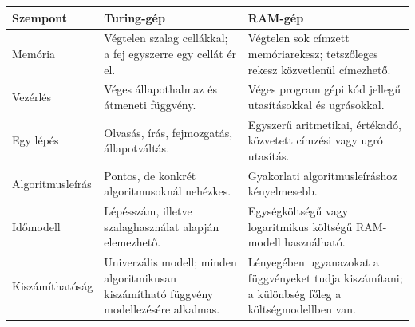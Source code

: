 \begin{tabularx}{\textwidth}{L{40mm}L{42mm}X}
\toprule
\textbf{Szempont} & \textbf{Turing-gép} & \textbf{RAM-gép} \\
\midrule
Memória & Végtelen szalag cellákkal; a fej egyszerre egy cellát ér el. & Végtelen sok címzett memóriarekesz; tetszőleges rekesz közvetlenül címezhető. \\
Vezérlés & Véges állapothalmaz és átmeneti függvény. & Véges program gépi kód jellegű utasításokkal és ugrásokkal. \\
Egy lépés & Olvasás, írás, fejmozgatás, állapotváltás. & Egyszerű aritmetikai, értékadó, közvetett címzési vagy ugró utasítás. \\
Algoritmusleírás & Pontos, de konkrét algoritmusoknál nehézkes. & Gyakorlati algoritmusleíráshoz kényelmesebb. \\
Időmodell & Lépésszám, illetve szalaghasználat alapján elemezhető. & Egységköltségű vagy logaritmikus költségű RAM-modell használható. \\
Kiszámíthatóság & Univerzális modell; minden algoritmikusan kiszámítható függvény modellezésére alkalmas. & Lényegében ugyanazokat a függvényeket tudja kiszámítani; a különbség főleg a költségmodellben van. \\
\bottomrule
\end{tabularx}

